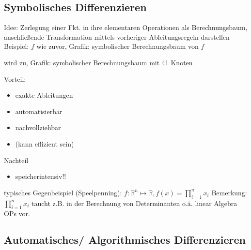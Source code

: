 \vspace{3cm}
\subsection{Symbolisches Differenzieren}
\label{subsec:symoblic_diff}
Idee: Zerlegung einer Fkt. in ihre elementaren Operationen als Berechnungsbaum, anschließende Transformation mittels vorheriger Ableitungsregeln darstellen
Beispiel: $f$ wie zuvor, Grafik: symbolischer Berechnungsbaum von $f$

\vspace{8cm}

wird zu, Grafik:  symbolischer Berechnungsbaum mit 41 Knoten

\vspace{9cm}

\noindent
Vorteil:
\begin{itemize}
	\item exakte Ableitungen
	\item automatisierbar
	\item nachvollziehbar
	\item (kann effizient sein)
\end{itemize}
Nachteil
\begin{itemize}
	\item speicherintensiv!!
\end{itemize}
typisches Gegenbeispiel (Speelpenning):
$f:\mathbb{R}^n\mapsto\mathbb{R}, f(x) = \prod_{i=1}^n x_i$
Bemerkung: $\prod_{i=1}^n x_i$ taucht z.B. in der Berechnung von Determinanten o.ä. linear Algebra OPs vor.

\subsection{Automatisches/ Algorithmisches Differenzieren}
\label{subsec:automatic/algorithmic}

